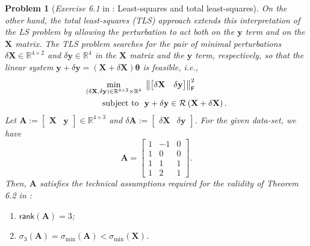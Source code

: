 \documentclass[11pt]{article}
\newtheorem{problem}{Problem}
\numberwithin{equation}{problem}
\begin{document}
\begin{problem} [\emph{Exercise 6.1} in \cite{calafiore2014optimization}: Least-squares and total least-squares]
{\indent On the other hand, the total least-squares (\textsf{TLS}) approach extends this interpretation of the \textsf{LS} problem by allowing the perturbation to act both on the $\mathbf{y}$ term and on the $\mathbf{X}$ matrix. The \textsf{TLS} problem searches for the pair of \emph{minimal perturbations} $\delta \mathbf{X} \in \mathbb{R}^{4 \times 2}$ and $\delta \mathbf{y} \in \mathbb{R}^4$ in the $\mathbf{X}$ matrix and the $\mathbf{y}$ term, respectively, so that the linear system $\mathbf{y} + \delta \mathbf{y} = \left( \mathbf{X} + \delta \mathbf{X} \right) \boldsymbol{\theta}$ is feasible, \emph{i.e.}, 
\begin{equation}
    \label{eqn1.5}
    \begin{split}
        \min_{\left( \delta \mathbf{X}, \delta \mathbf{y} \right) \in \mathbb{R}^{4 \times 2} \times \mathbb{R}^4} \ &\left\|
        \begin{bmatrix}
            \delta \mathbf{X} & \delta \mathbf{y}
        \end{bmatrix}
        \right\|_{\textsf{F}}^2 \\
        \textnormal{subject to }\ &\mathbf{y} + \delta \mathbf{y} \in \mathcal{R} \left( \mathbf{X} + \delta \mathbf{X} \right).
    \end{split}
\end{equation}
Let $\mathbf{A} := \begin{bmatrix} \mathbf{X} & \mathbf{y} \end{bmatrix} \in \mathbb{R}^{4 \times 3}$ and $\delta \mathbf{A} := \begin{bmatrix} \delta \mathbf{X} & \delta \mathbf{y} \end{bmatrix}$. For the given data-set, we have
\begin{equation*}
    \mathbf{A} =
    \begin{bmatrix}
        1 & -1 & 0 \\ 1 & 0 & 0 \\ 1 & 1 & 1 \\ 1 & 2 & 1
    \end{bmatrix}.
\end{equation*}
Then, $\mathbf{A}$ satisfies the technical assumptions required for the validity of \emph{Theorem 6.2} in \cite{calafiore2014optimization}:
\begin{enumerate} [label=(\roman*)]
    \item $\textsf{rank} (\mathbf{A}) = 3$;
    \item $\sigma_{3} (\mathbf{A}) = \sigma_{\min} (\mathbf{A}) < \sigma_{\min} (\mathbf{X})$.

\end{enumerate}}
\end{problem}
\end{document}
